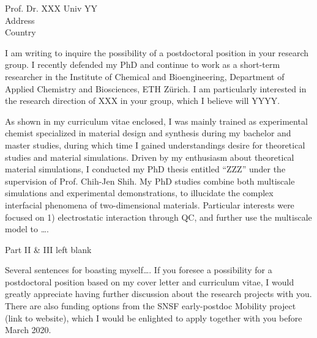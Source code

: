 \documentclass[11pt, a4paper]{cv}
\begin{document}
\makeletterheader[L]{}

\makecvfooter
{}
{}
{}

\recipient
  {Prof. Dr. XXX}
  {Univ YY \\ Address \\ Country}

\makelettertitle

\begin{cvletter}
  
  I am writing to inquire the possibility of a postdoctoral position
  in your research group. I recently defended my PhD and continue to
  work as a short-term researcher in the Institute of Chemical and
  Bioengineering, Department of Applied Chemistry and Biosciences, ETH
  Zürich. I am particularly interested in the research direction of
  XXX in your group, which I believe will YYYY.


  As shown in my curriculum vitae enclosed, I was mainly trained as
  experimental chemist specialized in material design and synthesis
  during my bachelor and master studies, during which time I gained
  understandings desire for theoretical studies and material
  simulations.  Driven by my enthusiasm about theoretical material
  simulations, I conducted my PhD thesis entitled “ZZZ” under the
  supervision of Prof. Chih-Jen Shih. My PhD studies combine both
  multiscale simulations and experimental demonstrations, to
  illucidate the complex interfacial phenomena of two-dimensional
  materials. Particular interests were focused on 1) electrostatic
  interaction through QC, and further use the multiscale model to ….




  Part II \& III left blank


  Several sentences for boasting myself….  If you foresee a
  possibility for a postdoctoral position based on my cover letter and
  curriculum vitae, I would greatly appreciate having further
  discussion about the research projects with you. There are also
  funding options from the SNSF early-postdoc Mobility project (link
  to website), which I would be enlighted to apply together with you
  before March 2020.


\end{cvletter}

\makeletterclosing




\end{document}
